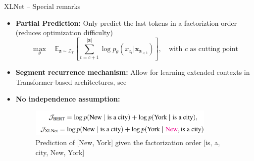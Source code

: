 \begin{frame}{XLNet -- Special remarks}
	
\vfill

	\begin{itemize}
		\item \textbf{Partial Prediction:} Only predict the last tokens in a factoriztion order (reduces optimization difficulty)
					{\small $$\max_{\theta} \quad \mathds{E}_{\mathbf{z}\sim\mathcal{Z}_T} \left[ \sum_{t=c+1}^{|\mathbf{z}|} \log p_\theta (x_{z_t} | \mathbf{x}_{\mathbf{z}_{< t}}) \right],\quad \mbox{with $c$ as cutting point}$$}
		\item \textbf{Segment recurrence mechanism:} Allow for learning extended contexts in Transformer-based architectures, see 
		\item \textbf{No independence assumption:}
	\begin{figure}
		\centering
		\includegraphics[width = 9cm]{figure/xlnet-objective}\\ 
		{\tiny Prediction of [New, York] given the factorization order [is, a, city, New, York]}\\
	\end{figure}
	\end{itemize}
	
\vfill

\end{frame}



